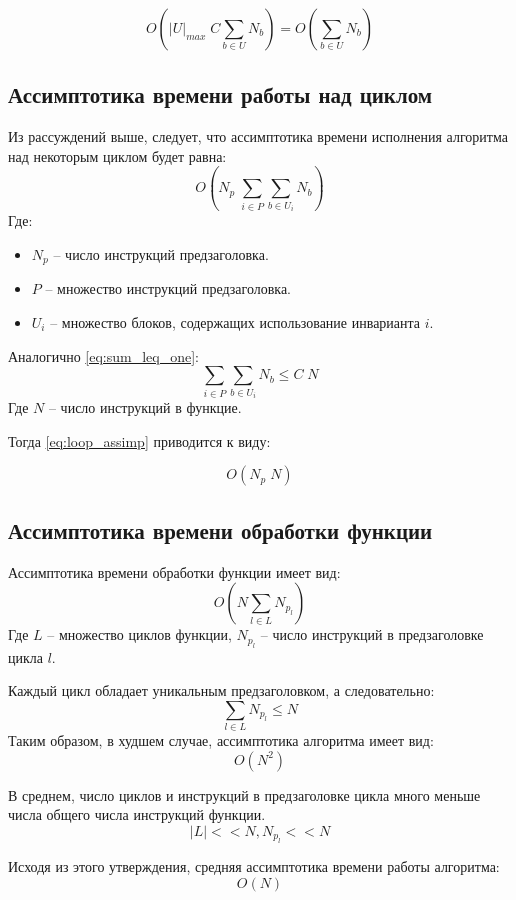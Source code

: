$$ O(|U|_{max} \; C \sum_{b \in U} N_b) = O(\sum_{b \in U} N_b) $$

\subsection{Ассимптотика времени работы над циклом}

Из рассуждений выше, следует, что ассимптотика времени исполнения алгоритма над некоторым циклом будет равна:
\begin{equation} \label{eq:loop_assimp}
O(N_p \; \sum_{i \in P} {\sum_{b \in U_i} N_b})
\end{equation}
Где:
\begin{itemize}
    \item $N_p$ -- число инструкций предзаголовка.
    \item $P$ -- множество инструкций предзаголовка.
    \item $U_i$ -- множество блоков, содержащих использование инварианта $i$.
\end{itemize}

Аналогично \ref{eq:sum_leq_one}:
$$ \sum_{i \in P} {\sum_{b \in U_i} N_b} \leq C \; N $$
Где $N$ -- число инструкций в функцие.

Тогда \ref{eq:loop_assimp} приводится к виду:

$$ O(N_p \; N) $$

\subsection{Ассимптотика времени обработки функции}

Ассимптотика времени обработки функции имеет вид:
\begin{equation} \label{eq:assimp}
O(N \sum_{l \in L} N_{p_l})
\end{equation}
Где $L$ -- множество циклов функции, $N_{p_l}$ -- число инструкций в предзаголовке цикла $l$.

Каждый цикл обладает уникальным предзаголовком, а следовательно:
$$ \sum_{l \in L} N_{p_l} \leq N $$
Таким образом, в худшем случае, ассимптотика алгоритма имеет вид:
\begin{equation} \label{eq:assimp_worst}
O(N^2)
\end{equation}

В среднем, число циклов и инструкций в предзаголовке цикла много меньше числа общего числа инструкций функции.
$$ |L| << N, N_{p_l} << N $$

Исходя из этого утверждения, средняя ассимптотика времени работы алгоритма:
\begin{equation} \label{eq:assimp_worst}
O(N)
\end{equation}


